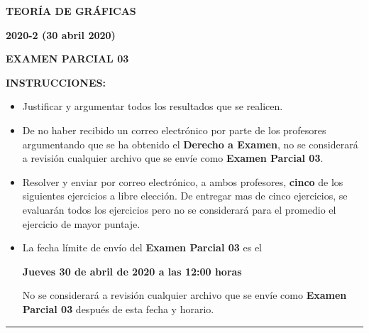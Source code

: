 \documentclass[12pt]{report}
\begin{document}
\begin{center}
\textbf{\LARGE {TEORÍA DE GRÁFICAS}}
\end{center}

\begin{center}
\textbf{{\large 2020-2 (30 abril 2020)}}
\end{center}

\begin{center}
\textbf{{\large EXAMEN PARCIAL 03}}
\end{center}

{\bf INSTRUCCIONES:}
\begin{itemize}
\item Justificar y argumentar todos los resultados que se realicen.

\item De no haber recibido un correo electrónico por parte de los profesores argumentando que se ha obtenido el \textbf{Derecho a Examen}, no se considerará a revisión cualquier archivo que se envíe como \textbf{Examen Parcial 03}.

\item Resolver y enviar por correo electrónico, a ambos profesores, \textbf{cinco} de los siguientes ejercicios a libre elección. De entregar mas de cinco ejercicios, se evaluarán todos los ejercicios pero no se considerará para el promedio el ejercicio de mayor puntaje.

\item La fecha límite de envío del \textbf{Examen Parcial 03} es el
\begin{center}
\textbf{Jueves 30 de abril de 2020 a las 12:00 horas}
\end{center}
No se considerará a revisión cualquier archivo que se envíe como \textbf{Examen Parcial 03} después de esta fecha y horario.

\end{itemize}

\begin{center}
\rule[0mm]{20cm}{0.2mm}
\end{center}
\end{document}
